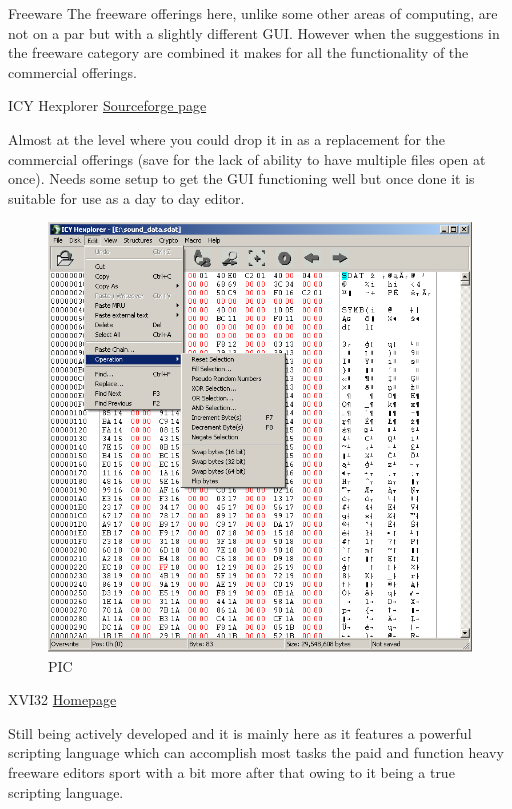 \documentclass[
]{book}
\begin{document}
Freeware The freeware offerings here, unlike some other areas of computing, are not on a par but with a slightly different GUI. However when the suggestions in the freeware category are combined it makes for all the functionality of the commercial offerings.

ICY Hexplorer \href{http://hexplorer.sourceforge.net/}{Sourceforge page}

Almost at the level where you could drop it in as a replacement for the commercial offerings (save for the lack of ability to have multiple files open at once). Needs some setup to get the GUI functioning well but once done it is suitable for use as a day to day editor.

\begin{figure}
\centering
\includegraphics{images/3_home_fast6191_romhackingguide_unrenamed_files___hackingguidehexeditorsshowcaseICYHexplorer1.png}
\caption{PIC}
\end{figure}

XVI32 \href{http://www.chmaas.handshake.de/delphi/freeware/xvi32/xvi32.htm}{Homepage}

Still being actively developed and it is mainly here as it features a powerful scripting language which can accomplish most tasks the paid and function heavy freeware editors sport with a bit more after that owing to it being a true scripting language.
\end{document}

